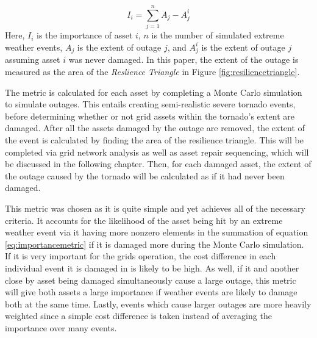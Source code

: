 \documentclass[12pt]{article}
\begin{document}
\begin{equation} 
    I_i = \sum_{j=1}^{n}A_j - A_j^i
    \label{eq:importancemetric}
\end{equation}
Here, $I_i$ is the importance of asset $i$, $n$ is the number of simulated extreme weather events, $A_j$ is the extent of outage $j$, and $A_j^i$ is the extent of outage $j$ assuming asset $i$ was never damaged. In this paper, the extent of the outage is measured as the area of the \textit{Reslience Triangle} in Figure \ref{fig:resiliencetriangle}. \par
The metric is calculated for each asset by completing a Monte Carlo simulation to simulate outages. This entails creating semi-realistic severe tornado events, before determining whether or not grid assets within the tornado’s extent are damaged. After all the assets damaged by the outage are removed, the extent of the event is calculated by finding the area of the resilience triangle. This will be completed via grid network analysis as well as asset repair sequencing, which will be discussed in the following chapter. Then, for each damaged asset, the extent of the outage caused by the tornado will be calculated as if it had never been damaged. \par
This metric was chosen as it is quite simple and yet achieves all of the necessary criteria. It accounts for the likelihood of the asset being hit by an extreme weather event via it having more nonzero elements in the summation of equation \eqref{eq:importancemetric} if it is damaged more during the Monte Carlo simulation. If it is very important for the grids operation, the cost difference in each individual event it is damaged in is likely to be high. As well, if it and another close by asset being damaged simultaneously cause a large outage, this metric will give both assets a large importance if weather events are likely to damage both at the same time. Lastly, events which cause larger outages are more heavily weighted since a simple cost difference is taken instead of averaging the importance over many events.
\end{document}
